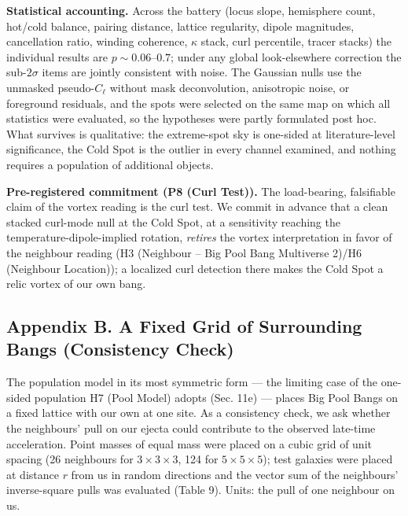 \documentclass[
  11pt,
]{article}
\begin{document}
\textbf{Statistical accounting.} Across the battery (locus slope,
hemisphere count, hot/cold balance, pairing distance, lattice
regularity, dipole magnitudes, cancellation ratio, winding coherence,
\(\kappa\) stack, curl percentile, tracer stacks) the individual results
are \(p \sim 0.06\)--\(0.7\); under any global look-elsewhere correction
the sub-\(2\sigma\) items are jointly consistent with noise. The
Gaussian nulls use the unmasked pseudo-\(C_\ell\) without mask
deconvolution, anisotropic noise, or foreground residuals, and the spots
were selected on the same map on which all statistics were evaluated, so
the hypotheses were partly formulated post hoc. What survives is
qualitative: the extreme-spot sky is one-sided at literature-level
significance, the Cold Spot is the outlier in every channel examined,
and nothing requires a population of additional objects.

\textbf{Pre-registered commitment (P8 (Curl Test)).} The load-bearing,
falsifiable claim of the vortex reading is the curl test. We commit in
advance that a clean stacked curl-mode null at the Cold Spot, at a
sensitivity reaching the temperature-dipole-implied rotation,
\emph{retires} the vortex interpretation in favor of the neighbour
reading (H3 (Neighbour -- Big Pool Bang Multiverse 2)/H6 (Neighbour
Location)); a localized curl detection there makes the Cold Spot a relic
vortex of our own bang.

\hypertarget{appendix-b.-a-fixed-grid-of-surrounding-bangs-consistency-check}{%
\subsection{\texorpdfstring{\textbf{Appendix B. A Fixed Grid of
Surrounding Bangs (Consistency
Check)}}{Appendix B. A Fixed Grid of Surrounding Bangs (Consistency Check)}}\label{appendix-b.-a-fixed-grid-of-surrounding-bangs-consistency-check}}

The population model in its most symmetric form --- the limiting case of
the one-sided population H7 (Pool Model) adopts (Sec. 11e) --- places
Big Pool Bangs on a fixed lattice with our own at one site. As a
consistency check, we ask whether the neighbours' pull on our ejecta
could contribute to the observed late-time acceleration. Point masses of
equal mass were placed on a cubic grid of unit spacing (26 neighbours
for \(3\times3\times3\), 124 for \(5\times5\times5\)); test galaxies
were placed at distance \(r\) from us in random directions and the
vector sum of the neighbours' inverse-square pulls was evaluated (Table
9). Units: the pull of one neighbour on us.
\end{document}
